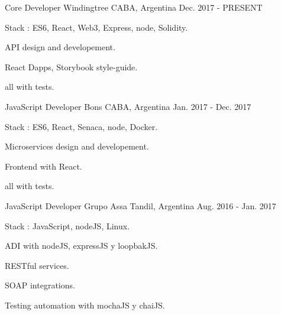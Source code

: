 


\begin{cventries}

\cventry
{ Core Developer} %
{Windingtree} %
{CABA, Argentina} %
{Dec. 2017 - PRESENT} %
{ %
\begin{cvitems}
\item {Stack : ES6, React, Web3, Express, node, Solidity.}
\item {API design and developement.}
\item {React Dapps, Storybook style-guide.}
\item {all with tests.}
\end{cvitems}
}
\cventry
{ JavaScript Developer} %
{Bons} %
{CABA, Argentina} %
{Jan. 2017 - Dec. 2017} %
{ %
\begin{cvitems}
\item {Stack : ES6, React, Senaca, node, Docker.}
\item {Microservices design and developement.}
\item {Frontend with React.}
\item {all with tests.}
\end{cvitems}
}
\cventry
{ JavaScript Developer} %
{Grupo Assa} %
{Tandil, Argentina} %
{Aug. 2016 - Jan. 2017} %
{ %
\begin{cvitems}
\item {Stack : JavaScript, nodeJS, Linux.}
\item {ADI with nodeJS, expressJS y loopbakJS.}
\item {RESTful services.}
\item {SOAP integrations.}
\item {Testing automation with mochaJS y chaiJS.}
\end{cvitems}
}


\end{cventries}
